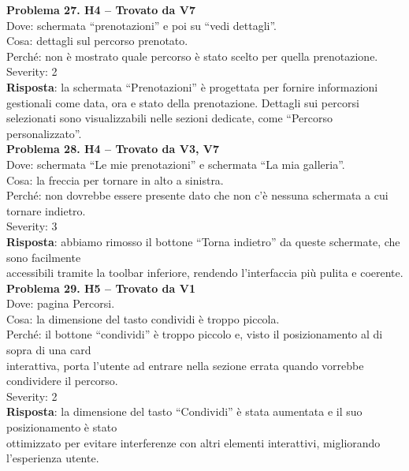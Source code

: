 \documentclass{article}
\begin{document}
\noindent \textbf{Problema 27. H4 – Trovato da V7} \\
Dove: schermata “prenotazioni” e poi su “vedi dettagli”. \\
Cosa: dettagli sul percorso prenotato. \\
Perché: non è mostrato quale percorso è stato scelto per quella prenotazione. \\
Severity: 2 \\
\textbf{Risposta}: la schermata “Prenotazioni” è progettata per fornire informazioni gestionali come data, ora e stato della prenotazione. Dettagli sui percorsi selezionati sono visualizzabili nelle sezioni dedicate, come “Percorso personalizzato”.\\

\noindent \textbf{Problema 28. H4 – Trovato da V3, V7} \\
Dove: schermata “Le mie prenotazioni” e schermata “La mia galleria”. \\
Cosa: la freccia per tornare in alto a sinistra. \\
Perché: non dovrebbe essere presente dato che non c'è nessuna schermata a cui tornare indietro. \\
Severity: 3 \\
\textbf{Risposta}: abbiamo rimosso il bottone “Torna indietro” da queste schermate, che sono facilmente\\ accessibili tramite la toolbar inferiore, rendendo l’interfaccia più pulita e coerente.\\

\noindent \textbf{Problema 29. H5 – Trovato da V1} \\
Dove: pagina Percorsi. \\
Cosa: la dimensione del tasto condividi è troppo piccola. \\
Perché: il bottone “condividi” è troppo piccolo e, visto il posizionamento al di sopra di una card \\ interattiva, porta l’utente ad entrare nella sezione errata quando vorrebbe condividere il percorso. \\
Severity: 2 \\
\textbf{Risposta}: la dimensione del tasto “Condividi” è stata aumentata e il suo posizionamento è stato\\ ottimizzato per evitare interferenze con altri elementi interattivi, migliorando l’esperienza utente.\\
\end{document}

